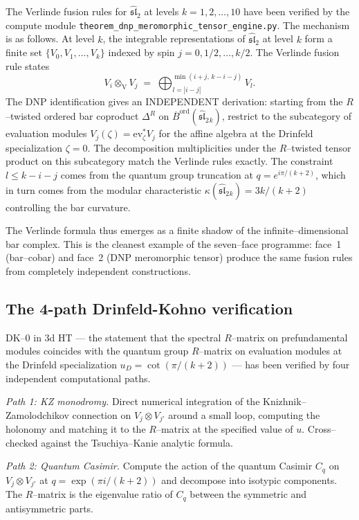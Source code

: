 \documentclass[11pt]{article}
\newcommand{\barB}{\overline{B}}
\begin{document}
The Verlinde fusion rules for $\widehat{\mathfrak{sl}}_2$ at levels
$k = 1, 2, \ldots, 10$ have been verified by the compute module
\texttt{theorem\_dnp\_meromorphic\_tensor\_engine.py}.  The mechanism is as
follows.  At level $k$, the integrable representations of
$\widehat{\mathfrak{sl}}_2$ at level $k$ form a finite set
$\{V_0, V_1, \ldots, V_k\}$ indexed by spin $j = 0, 1/2, \ldots, k/2$.  The
Verlinde fusion rule states
\[
  V_i \otimes_{\mathrm{V}} V_j \;=\; \bigoplus_{l = |i-j|}^{\min(i+j,\, k-i-j)} V_l.
\]
The DNP identification gives an INDEPENDENT derivation: starting from the
$R$--twisted ordered bar coproduct $\Delta^R$ on
$\barB^{\mathrm{ord}}(\widehat{\mathfrak{sl}}_2{}_k)$, restrict to the
subcategory of evaluation modules
$V_j(\zeta) = \mathrm{ev}_\zeta^* V_j$ for the affine algebra at the
Drinfeld specialization $\zeta = 0$.  The decomposition multiplicities
under the $R$--twisted tensor product on this subcategory match the
Verlinde rules exactly.  The constraint $l \leq k - i - j$ comes from the
quantum group truncation at $q = e^{i\pi/(k+2)}$, which in turn comes
from the modular characteristic $\kappa(\widehat{\mathfrak{sl}}_2{}_k) =
3k/(k+2)$ controlling the bar curvature.

The Verlinde formula thus emerges as a finite shadow of the
infinite--dimensional bar complex.  This is the cleanest example of the
seven--face programme: face~1 (bar--cobar) and face~2 (DNP meromorphic
tensor) produce the same fusion rules from completely independent
constructions.

\subsection{The 4-path Drinfeld-Kohno verification}

DK--$0$ in 3d HT --- the statement that the spectral $R$--matrix on
prefundamental modules coincides with the quantum group $R$--matrix on
evaluation modules at the Drinfeld specialization $u_D = \cot(\pi/(k+2))$
--- has been verified by four independent computational paths.

\emph{Path 1: KZ monodromy.}  Direct numerical integration of the
Knizhnik--Zamolodchikov connection on $V_j \otimes V_{j'}$ around a small
loop, computing the holonomy and matching it to the $R$--matrix at the
specified value of $u$.  Cross--checked against the Tsuchiya--Kanie
analytic formula.

\emph{Path 2: Quantum Casimir.}  Compute the action of the quantum Casimir
$C_q$ on $V_j \otimes V_{j'}$ at $q = \exp(\pi i/(k+2))$ and decompose into
isotypic components.  The $R$--matrix is the eigenvalue ratio of $C_q$
between the symmetric and antisymmetric parts.
\end{document}
